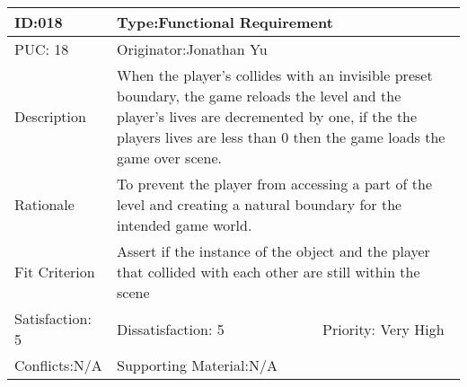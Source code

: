 \documentclass{article}
\begin{document}
	\begin{table}[H]

		\begin{tabular}{|l|l|l|}
			\hline
			ID:018 & \multicolumn{2}{l|}{Type:Functional Requirement} \\ \hline
			PUC: 18& \multicolumn{2}{l|}{Originator:Jonathan Yu} \\ \hline
			Description & \multicolumn{2}{m{0.85\textwidth}|}{When the player’s collides with an invisible preset boundary, the game reloads the level and the player’s lives are decremented by one, if the the players lives are less than 0 then the game loads the game over scene.} \\ \hline
			Rationale & \multicolumn{2}{m{0.85\textwidth}|}{To prevent the player from accessing a part of the level and creating a natural boundary for the intended game world.} \\ \hline
			Fit Criterion & \multicolumn{2}{m{0.85\textwidth}|}{Assert if the instance of the object and the player that collided with each other are still within the scene} \\ \hline
			Satisfaction: 5 & Dissatisfaction: 5 & Priority: Very High \\ \hline
			Conflicts:N/A & Supporting Material:N/A &  \\ \hline
		\end{tabular}
	\end{table}
\end{document}
